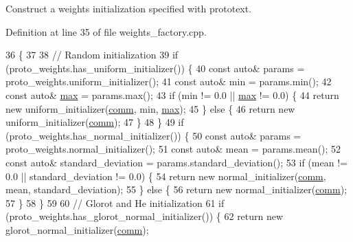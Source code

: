 Construct a weights initialization specified with prototext. 

Definition at line 35 of file weights\+\_\+factory.\+cpp.


\begin{DoxyCode}
36                                                                                    \{
37 
38   \textcolor{comment}{// Random initialization}
39   \textcolor{keywordflow}{if} (proto\_weights.has\_uniform\_initializer()) \{
40     \textcolor{keyword}{const} \textcolor{keyword}{auto}& params = proto\_weights.uniform\_initializer();
41     \textcolor{keyword}{const} \textcolor{keyword}{auto}& min = params.min();
42     \textcolor{keyword}{const} \textcolor{keyword}{auto}& \hyperlink{base_8hpp_ac47a6ee5278a53898222a48639a2bf39a2ffe4e77325d9a7152f7086ea7aa5114}{max} = params.max();
43     \textcolor{keywordflow}{if} (min != 0.0 || \hyperlink{base_8hpp_ac47a6ee5278a53898222a48639a2bf39a2ffe4e77325d9a7152f7086ea7aa5114}{max} != 0.0) \{
44       \textcolor{keywordflow}{return} \textcolor{keyword}{new} uniform\_initializer(\hyperlink{file__io_8cpp_ab048c6f9fcbcfaa57ce68b00263dbebe}{comm}, min, \hyperlink{base_8hpp_ac47a6ee5278a53898222a48639a2bf39a2ffe4e77325d9a7152f7086ea7aa5114}{max});
45     \} \textcolor{keywordflow}{else} \{
46       \textcolor{keywordflow}{return} \textcolor{keyword}{new} uniform\_initializer(\hyperlink{file__io_8cpp_ab048c6f9fcbcfaa57ce68b00263dbebe}{comm});
47     \}
48   \}
49   \textcolor{keywordflow}{if} (proto\_weights.has\_normal\_initializer()) \{
50     \textcolor{keyword}{const} \textcolor{keyword}{auto}& params = proto\_weights.normal\_initializer();
51     \textcolor{keyword}{const} \textcolor{keyword}{auto}& mean = params.mean();
52     \textcolor{keyword}{const} \textcolor{keyword}{auto}& standard\_deviation = params.standard\_deviation();
53     \textcolor{keywordflow}{if} (mean != 0.0 || standard\_deviation != 0.0) \{
54       \textcolor{keywordflow}{return} \textcolor{keyword}{new} normal\_initializer(\hyperlink{file__io_8cpp_ab048c6f9fcbcfaa57ce68b00263dbebe}{comm}, mean, standard\_deviation);
55     \} \textcolor{keywordflow}{else} \{
56       \textcolor{keywordflow}{return} \textcolor{keyword}{new} normal\_initializer(\hyperlink{file__io_8cpp_ab048c6f9fcbcfaa57ce68b00263dbebe}{comm});
57     \}
58   \}
59 
60   \textcolor{comment}{// Glorot and He initialization}
61   \textcolor{keywordflow}{if} (proto\_weights.has\_glorot\_normal\_initializer()) \{
62     \textcolor{keywordflow}{return} \textcolor{keyword}{new} glorot\_normal\_initializer(\hyperlink{file__io_8cpp_ab048c6f9fcbcfaa57ce68b00263dbebe}{comm});

\end{DoxyCode}
